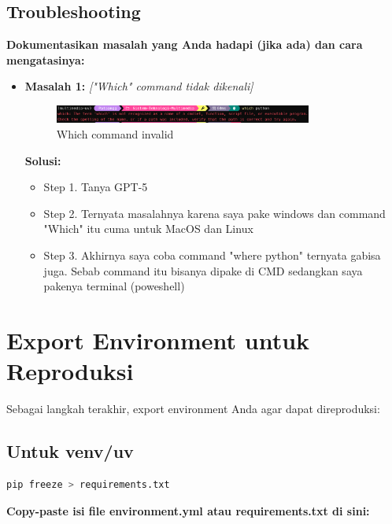\documentclass[11pt,a4paper]{article}
\begin{document}
\subsection{Troubleshooting}
\textbf{Dokumentasikan masalah yang Anda hadapi (jika ada) dan cara mengatasinya:}

\begin{itemize}
    \item \textbf{Masalah 1:} \textit{["Which" command tidak dikenali]}
    \begin{figure}[H]
        \centering
        \includegraphics[width=0.8\textwidth]{Figure/img8.png}
        \caption{Which command invalid}
        \vspace{0.1cm}
    \end{figure}
    \textbf{Solusi:}
    \begin{itemize}
        \item Step 1. Tanya GPT-5
        \item Step 2. Ternyata masalahnya karena saya pake windows dan command "Which" itu cuma untuk MacOS dan Linux
        \item Step 3. Akhirnya saya coba command "where python" ternyata gabisa juga. Sebab command itu bisanya dipake di CMD sedangkan saya pakenya terminal (poweshell)

    \end{itemize}
\end{itemize}

\section{Export Environment untuk Reproduksi}
Sebagai langkah terakhir, export environment Anda agar dapat direproduksi:

\subsection{Untuk venv/uv}
\begin{lstlisting}[language=bash, caption=Export pip requirements]
pip freeze > requirements.txt
\end{lstlisting}

\textbf{Copy-paste isi file environment.yml atau requirements.txt di sini:}
\end{document}

